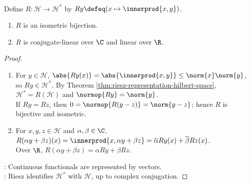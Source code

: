 \begin{corollary} \label{cor:hilbert-space-continuous-dual-riesz-isometric} \\
Define $R:\mathcal{H}\to\mathcal{H}^*$ by $Ry\defeq(x\mapsto\innerprod{x,y})$.
\begin{enumerate}[label=(\roman*)]
\setlength{\itemsep}{0pt}
\item $R$ is an isometric bijection.
\item $R$ is conjugate-linear over $\C$ and linear over $\R$.
\end{enumerate}
\begin{proof}
\begin{enumerate}[label=(\roman*)]
\setlength{\itemsep}{0pt}
\item For $y\in\mathcal{H}$, $\abs{Ry(x)}=\abs{\innerprod{x,y}}\leq\norm{x}\norm{y}$, so $Ry\in\mathcal{H}^*$. By Theorem \ref{thm:riesz-representation-hilbert-space}, $\mathcal{H}^*=R(\mathcal{H})$ and $\normop{Ry}=\norm{y}$.\\
If $Ry=Rz$, then $0=\normop{R(y-z)}=\norm{y-z}$; hence $R$ is bijective and isometric.
\item For $x,y,z\in\mathcal{H}$ and $\alpha,\beta\in\C$, $R(\alpha y+\beta z)(x)=\innerprod{x,\alpha y+\beta z}=\overline{\alpha}Ry(x)+\overline{\beta}Rz(x)$.\\
Over $\R$, $R(\alpha y+\beta z)=\alpha Ry+\beta Rz$.
\end{enumerate}
: Continuous functionals are represented by vectors.\\
: Riesz identifies $\mathcal{H}^*$ with $\mathcal{H}$, up to complex conjugation.
\end{proof}
\end{corollary}

